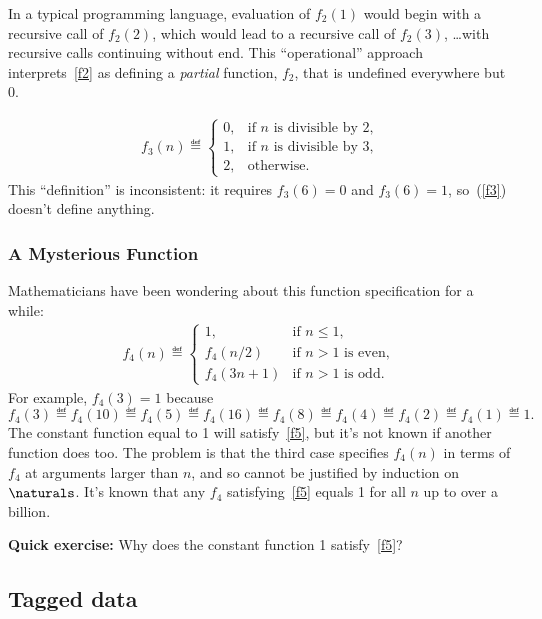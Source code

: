 \begin{definition}
In a typical programming language, evaluation of $f_2(1)$ would begin with
a recursive call of $f_2(2)$, which would lead to a recursive call of
$f_2(3)$, \dots with recursive calls continuing without end.  This
``operational'' approach interprets~\eqref{f2} as defining a
\emph{partial} function, $f_2$, that is undefined everywhere but 0.

\begin{eqnarray}\label{f3}
f_3(n) \eqdef \begin{cases}
  0, &  \text{if $n$ is divisible by 2,}\\
  1, &  \text{if $n$ is divisible by 3,}\\
  2, & \text{otherwise.}
 \end{cases}
\end{eqnarray}
This ``definition'' is inconsistent: it requires $f_3(6) = 0$ and $f_3(6)
=1$, so~(\ref{f3}) doesn't define anything.

\subsubsection{A Mysterious Function}
Mathematicians have been wondering about this function specification for a
while:
\begin{eqnarray}\label{f5}
f_4(n) \eqdef\begin{cases}
 1, & \text{if $n\le 1$},\\
 f_4(n/2) &  \text{if $n>1$ is even},\\
 f_4(3n+1)& \text{if $n>1$ is odd}.
\end{cases}
\end{eqnarray}
For example, $f_4(3)=1$ because
\[
f_4(3)\eqdef f_4(10)\eqdef f_4(5)\eqdef f_4(16)\eqdef f_4(8)\eqdef
f_4(4)\eqdef f_4(2)\eqdef f_4(1)\eqdef 1.
\]
The constant function equal to 1 will satisfy~\eqref{f5}, but it's not
known if another function does too.  The problem is that the third case
specifies $f_4(n)$ in terms of $f_4$ at arguments larger than $n$, and so
cannot be justified by induction on $\naturals$.  It's known that any
$f_4$ satisfying~\eqref{f5} equals 1 for all $n$ up to over a billion.

\textbf{Quick exercise:} Why does the constant function 1
satisfy~\eqref{f5}?

\begin{staffnotes}

\section{Tagged data}


\end{staffnotes}
\end{definition}
